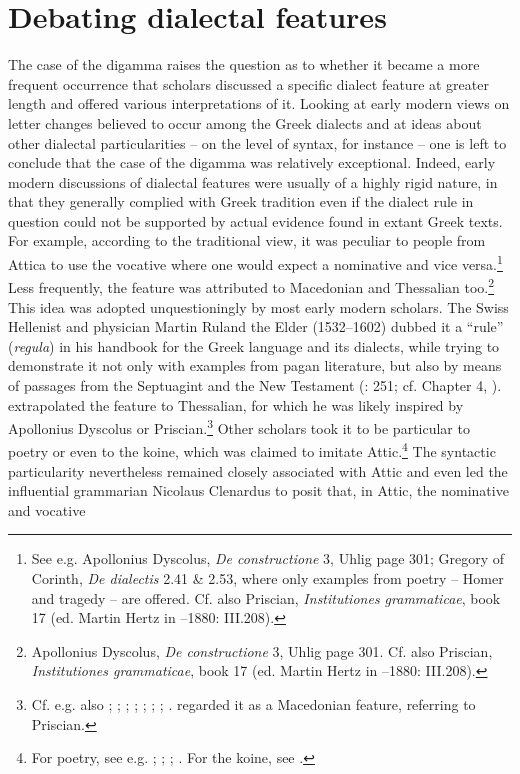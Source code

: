 \section{Debating dialectal features}\label{sec:6.4}

The case of the digamma raises the question as to whether it became a more frequent occurrence that scholars discussed a specific dialect feature at greater length and offered various interpretations of it. Looking at early modern views on letter changes believed to occur among the Greek dialects and at ideas about other dialectal particularities – on the level of syntax, for instance – one is left to conclude that the case of the digamma was relatively exceptional. Indeed, early modern discussions of dialectal features were usually of a highly rigid nature, in that they generally complied with Greek tradition even if the dialect rule in question could not be supported by actual evidence found in extant Greek texts. For example, according to the traditional view, it was peculiar to people from Attica to use the vocative where one would expect a nominative and vice versa.\footnote{See e.g. Apollonius Dyscolus, \textit{De constructione} 3, Uhlig page 301; Gregory of Corinth, \textit{De dialectis} 2.41 \& 2.53, where only examples from poetry – Homer and tragedy – are offered. Cf. also Priscian, \textit{Institutiones grammaticae}, book 17 (ed. Martin Hertz in \citealt{Keil1855}–1880: III.208).} Less frequently, the feature was attributed to Macedonian and Thessalian too.\footnote{Apollonius Dyscolus, \textit{De constructione} 3, Uhlig page 301. Cf. also Priscian, \textit{Institutiones grammaticae}, book 17 (ed. Martin Hertz in \citealt{Keil1855}–1880: III.208).} This idea was adopted unquestioningly by most early modern scholars. The Swiss Hellenist and physician Martin Ruland the Elder (1532–1602) dubbed it a “rule” (\textit{regula}) in his handbook for the Greek language and its dialects, while trying to demonstrate it not only with examples from pagan literature, but also by means of passages from the Septuagint and the New Testament (\citealt{Ruland1556}: 251; cf. Chapter 4, ). \citet[302]{Ruland1556} extrapolated the feature to Thessalian, for which he was likely inspired by Apollonius Dyscolus or Priscian.\footnote{Cf. e.g. also \citet[36\textsc{\textsuperscript{r}}]{Da1509}; \citet[216]{Vergara1537}; \citet[50\textsc{\textsuperscript{v}}]{Nunez1555}; \citet[\textsc{x.1}\textsc{\textsuperscript{v}}]{Dabercusius1577}; \citet[5 (second pagination sequence)]{Rhenius1626}; \citet[8-9]{Pasor1632}; \citet[85-87]{Wyss1650}; \citet[88]{Leusden1670}. \citet[\textsc{b.3}\textsc{\textsuperscript{r}}]{Kirchmaier1709} regarded it as a Macedonian feature, referring to Priscian.} Other scholars took it to be particular to poetry or even to the koine, which was claimed to imitate Attic.\footnote{For poetry, see e.g. \citet[\textsc{q.}i\textsc{\textsuperscript{v}}]{Amerot1520}; \citet[129]{Antesignanus1554}; \citet[34]{Gretser1593}; \citet[157]{Schmidt1604}. For the koine, see \citet[54]{Lancelot1655}.} The syntactic particularity nevertheless remained closely associated with Attic and even led the influential grammarian Nicolaus Clenardus to posit that, in Attic, the nominative and vocative 